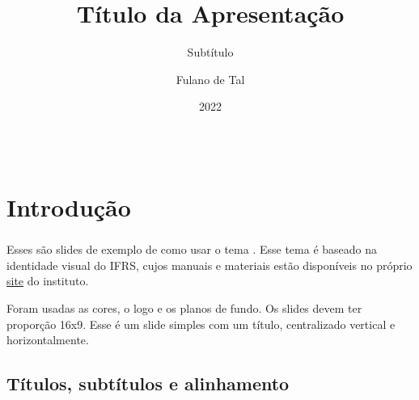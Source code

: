\documentclass[aspectratio=169]{beamer}
\title{Título da Apresentação}
\subtitle{Subtítulo}
\date{2022}
\author[Fulano]{Fulano de Tal}
\institute{Nome do Campus}
\begin{document}
\maketitle

\begin{frame}[t]\frametitle{\inserttitle}\framesubtitle{\insertsubtitle}

  \begin{columns}[T]
    \begin{column}{.5\textwidth}
     \tableofcontents[hidesubsections,sections={1-4}]
    \end{column}
    \begin{column}{.5\textwidth}
      \tableofcontents[hidesubsections,sections={5-8}]
    \end{column}
  \end{columns}
\end{frame}

\section{Introdução}

\begin{frame}[c]\frametitle{\secname}\centering
  Esses são slides de exemplo de como usar o tema .
  Esse tema é baseado na identidade visual do IFRS, cujos manuais e materiais estão disponíveis no próprio \href{https://ifrs.edu.br/institucional/comunicacao/materiais-para-download/}{site} do instituto.

  Foram usadas as cores, o logo e os planos de fundo.
  Os slides devem ter proporção 16x9.
  Esse é um slide simples com um título, centralizado vertical e horizontalmente.
\end{frame}

\subsection{Títulos, subtítulos e alinhamento}
\end{document}
